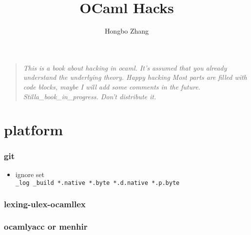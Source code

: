 \documentclass[svgnames,12pt,a4paper]{report}
\begin{document}
\setcounter{tocdepth}{4}
\title{OCaml Hacks}
\author{Hongbo Zhang}

\maketitle
{}
\begin{quotation}
  \textit{
This is a book about hacking in ocaml.
It's assumed that you already understand the underlying theory. Happy hacking
Most parts are filled with code blocks, maybe I will add some comments in the future. Stilla\_book\_in\_progress. Don't distribute it.}

\smiley
\end{quotation}



\newpage

\tableofcontents
\listoftodos
\vspace*{1cm}

\newpage



\newpage 
\chapter{platform}









\subsection{git}
\begin{itemize}
\item ignore set \\
  \verb|_log _build *.native *.byte *.d.native *.p.byte|
\end{itemize}

\subsection{lexing-ulex-ocamllex}
\label{sec:parsing-lexing-1}




\subsection{ocamlyacc or menhir}
\label{sec:ocamlyacc}

\end{document}

